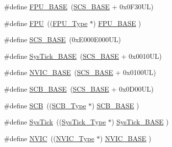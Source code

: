 \begin{DoxyCompactItemize}
\item 
\#define \hyperlink{group___c_m_s_i_s__core__base_ga4dcad4027118c098c07bcd575f1fbb28}{F\+P\+U\+\_\+\+B\+A\+SE}~(\hyperlink{group___c_m_s_i_s__core__base_ga3c14ed93192c8d9143322bbf77ebf770}{S\+C\+S\+\_\+\+B\+A\+SE} +  0x0\+F30\+U\+L)
\item 
\#define \hyperlink{group___c_m_s_i_s__core__base_gabc7c93f2594e85ece1e1a24f10591428}{F\+PU}~((\hyperlink{struct_f_p_u___type}{F\+P\+U\+\_\+\+Type}       $\ast$)     \hyperlink{group___c_m_s_i_s__core__base_ga4dcad4027118c098c07bcd575f1fbb28}{F\+P\+U\+\_\+\+B\+A\+SE}         )
\item 
\#define \hyperlink{group___c_m_s_i_s__core__base_ga3c14ed93192c8d9143322bbf77ebf770}{S\+C\+S\+\_\+\+B\+A\+SE}~(0x\+E000\+E000\+U\+L)
\item 
\#define \hyperlink{group___c_m_s_i_s__core__base_ga58effaac0b93006b756d33209e814646}{Sys\+Tick\+\_\+\+B\+A\+SE}~(\hyperlink{group___c_m_s_i_s__core__base_ga3c14ed93192c8d9143322bbf77ebf770}{S\+C\+S\+\_\+\+B\+A\+SE} +  0x0010\+U\+L)
\item 
\#define \hyperlink{group___c_m_s_i_s__core__base_gaa0288691785a5f868238e0468b39523d}{N\+V\+I\+C\+\_\+\+B\+A\+SE}~(\hyperlink{group___c_m_s_i_s__core__base_ga3c14ed93192c8d9143322bbf77ebf770}{S\+C\+S\+\_\+\+B\+A\+SE} +  0x0100\+U\+L)
\item 
\#define \hyperlink{group___c_m_s_i_s__core__base_gad55a7ddb8d4b2398b0c1cfec76c0d9fd}{S\+C\+B\+\_\+\+B\+A\+SE}~(\hyperlink{group___c_m_s_i_s__core__base_ga3c14ed93192c8d9143322bbf77ebf770}{S\+C\+S\+\_\+\+B\+A\+SE} +  0x0\+D00\+U\+L)
\item 
\#define \hyperlink{group___c_m_s_i_s__core__base_gaaaf6477c2bde2f00f99e3c2fd1060b01}{S\+CB}~((\hyperlink{struct_s_c_b___type}{S\+C\+B\+\_\+\+Type}       $\ast$)     \hyperlink{group___c_m_s_i_s__core__base_gad55a7ddb8d4b2398b0c1cfec76c0d9fd}{S\+C\+B\+\_\+\+B\+A\+SE}      )
\item 
\#define \hyperlink{group___c_m_s_i_s__core__base_gacd96c53beeaff8f603fcda425eb295de}{Sys\+Tick}~((\hyperlink{struct_sys_tick___type}{Sys\+Tick\+\_\+\+Type}   $\ast$)     \hyperlink{group___c_m_s_i_s__core__base_ga58effaac0b93006b756d33209e814646}{Sys\+Tick\+\_\+\+B\+A\+SE}  )
\item 
\#define \hyperlink{group___c_m_s_i_s__core__base_gac8e97e8ce56ae9f57da1363a937f8a17}{N\+V\+IC}~((\hyperlink{struct_n_v_i_c___type}{N\+V\+I\+C\+\_\+\+Type}      $\ast$)     \hyperlink{group___c_m_s_i_s__core__base_gaa0288691785a5f868238e0468b39523d}{N\+V\+I\+C\+\_\+\+B\+A\+SE}     )

\end{DoxyCompactItemize}
